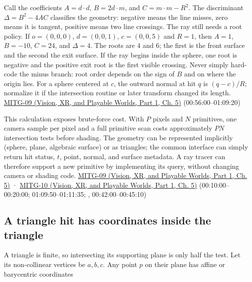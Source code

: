 Call the coefficients \(A=d\cdot d\), \(B=2d\cdot m\), and \(C=m\cdot m-R^2\). The discriminant \(\Delta=B^2-4AC\) classifies the geometry: negative means the line misses, zero means it is tangent, positive means two line crossings. The ray still needs a root policy. If \(o=(0,0,0)\), \(d=(0,0,1)\), \(c=(0,0,5)\) and \(R=1\), then \(A=1\), \(B=-10\), \(C=24\), and \(\Delta=4\). The roots are \(4\) and \(6\); the first is the front surface and the second the exit surface. If the ray begins inside the sphere, one root is negative and the positive exit root is the first visible crossing. Never simply hard-code the minus branch: root order depends on the sign of \(B\) and on where the origin lies. For a sphere centered at \(c\), the outward normal at hit \(q\) is \((q-c)/R\); normalize it if the intersection routine or later transform changed its length. \href{../07-Vision-XR-and-Playable-Worlds-P01/main.pdf\#nameddest=04-visual-computing-ii-ch036-mitg-09---ray-casting}{MITG-09 (Vision, XR, and Playable Worlds, Part 1, Ch. 5)} (00:56:00--01:09:20)

This calculation exposes brute-force cost. With \(P\) pixels and \(N\) primitives, one camera sample per pixel and a full primitive scan costs approximately \(PN\) intersection tests before shading. The geometry can be represented implicitly (sphere, plane, algebraic surface) or as triangles; the common interface can simply return hit status, \(t\), point, normal, and surface metadata. A ray tracer can therefore support a new primitive by implementing its query, without changing camera or shading code. \href{../07-Vision-XR-and-Playable-Worlds-P01/main.pdf\#nameddest=04-visual-computing-ii-ch036-mitg-09---ray-casting}{MITG-09 (Vision, XR, and Playable Worlds, Part 1, Ch. 5)} · \href{../07-Vision-XR-and-Playable-Worlds-P01/main.pdf\#nameddest=04-visual-computing-ii-ch036-mitg-10---ray-casting-ii}{MITG-10 (Vision, XR, and Playable Worlds, Part 1, Ch. 5)} (00:10:00--00:20:00; 01:09:50--01:11:35; , 00:42:00--00:45:10)

\subsection{A triangle hit has coordinates inside the triangle}\label{04-visual-computing-ii-ch028-a-triangle-hit-has-coordinates-inside-the-triangle}

\hypertarget{04-visual-computing-ii-ch028-a-triangle-hit-has-coordinates-inside-the-triangle}{}

A triangle is finite, so intersecting its supporting plane is only half the test. Let its non-collinear vertices be \(a,b,c\). Any point \(p\) on their plane has affine or barycentric coordinates

